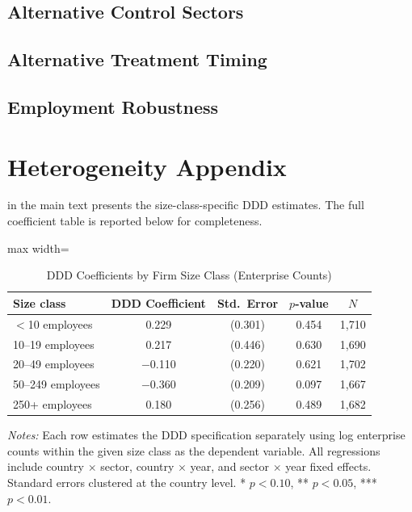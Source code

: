\documentclass[12pt]{article}
\begin{document}


\subsection{Alternative Control Sectors}



\subsection{Alternative Treatment Timing}



\subsection{Employment Robustness}




\section{Heterogeneity Appendix}
\label{sec:app_hetero}

 in the main text presents the size-class-specific DDD estimates. The full coefficient table is reported below for completeness.

\begin{table}[H]
\centering
\caption{DDD Coefficients by Firm Size Class (Enterprise Counts)}
\label{tab:size_class}
\begin{adjustbox}{max width=\textwidth}
\begin{tabular}{lcccc}
\toprule
Size class & DDD Coefficient & Std.\ Error & $p$-value & $N$ \\
\midrule
$<$10 employees & 0.229 & (0.301) & 0.454 & 1,710 \\
10--19 employees & 0.217 & (0.446) & 0.630 & 1,690 \\
20--49 employees & $-$0.110 & (0.220) & 0.621 & 1,702 \\
50--249 employees & $-$0.360 & (0.209) & 0.097 & 1,667 \\
250+ employees & 0.180 & (0.256) & 0.489 & 1,682 \\
\bottomrule
\end{tabular}
\end{adjustbox}
\par\vspace{0.3em}
{\footnotesize \textit{Notes:} Each row estimates the DDD specification separately using log enterprise counts within the given size class as the dependent variable. All regressions include country $\times$ sector, country $\times$ year, and sector $\times$ year fixed effects. Standard errors clustered at the country level. * $p<0.10$, ** $p<0.05$, *** $p<0.01$.}
\end{table}
\end{document}
